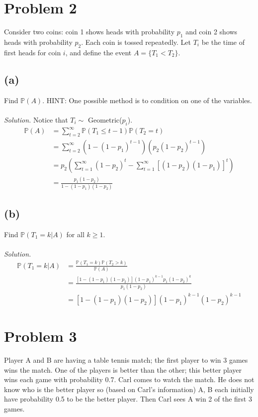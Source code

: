 \documentclass{article}
\newcommand{\prob}{\mathbb{P}}
\begin{document}
\section*{Problem 2}
Consider two coins: coin 1 shows heads with probability $p_1$ and coin 2 shows heads with probability $p_2$. Each coin is tossed repeatedly. Let $T_i$ be the time of first heads for coin $i$, and define the event $A=\{T_1<T_2\}$.
\subsection*{(a)}
Find $\prob(A).$ HINT: One possible method is to condition on one of the variables.
\color{blue}
\\\\\textit{Solution. }Notice that $T_i \sim$ Geometric($p_i$).
\begin{equation*}
    \begin{split}
        \prob(A) &=\sum_{t=2}^\infty\prob(T_1\leq t-1)\prob(T_2=t)\\
        &= \sum_{t=2}^\infty(1-(1-p_1)^{t-1})(p_2(1-p_2)^{t-1})\\
        &=p_2\left(\sum_{t=1}^\infty(1-p_2)^{t}-\sum_{t=1}^\infty[(1-p_2)(1-p_1)]^t\right)\\
        &= \frac{p_1(1-p_2)}{1-(1-p_1)(1-p_2)}
    \end{split}
\end{equation*}
\color{black}
\subsection*{(b)}
Find $\prob(T_1=k\vert A)$ for all $k\geq 1$.
\color{blue}
\\\\\textit{Solution. }
\begin{equation*}
    \begin{split}
        \prob(T_1=k\vert A) &= \frac{\prob(T_1=k)\prob(T_2>k)}{\prob(A)}\\
        &= \frac{[1-(1-p_1)(1-p_2)](1-p_1)^{k-1}p_1(1-p_2)^k}{p_1(1-p_2)}\\
        &=[1-(1-p_1)(1-p_2)](1-p_1)^{k-1}(1-p_2)^{k-1}
    \end{split}
\end{equation*}
\color{black}

\section*{Problem 3}
Player A and B are having a table tennis match; the first player to win 3 games wins the match. One of the players is better than the other; this better player wins each game with probability 0.7. Carl comes to watch the match. He does not know who is the better player so (based on Carl's information) A, B each initially have probability 0.5 to be the better player. Then Carl sees A win 2 of the first 3 games.
\end{document}
